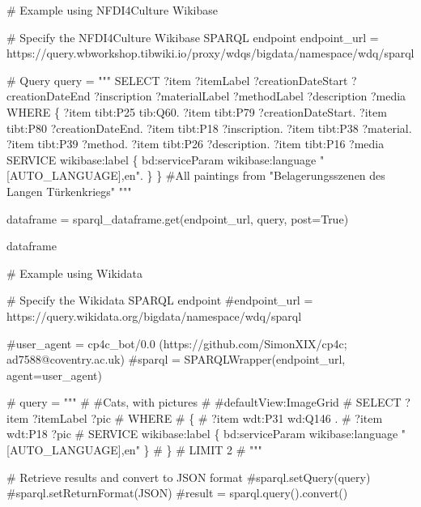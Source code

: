 \documentclass[
  letterpaper,
  DIV=11,
  numbers=noendperiod]{scrreprt}
\newenvironment{Shaded}{\begin{snugshade}}{\end{snugshade}}
\newcommand{\CommentTok}[1]{\textcolor[rgb]{0.37,0.37,0.37}{#1}}
\newcommand{\NormalTok}[1]{\textcolor[rgb]{0.00,0.23,0.31}{#1}}
\newcommand{\OperatorTok}[1]{\textcolor[rgb]{0.37,0.37,0.37}{#1}}
\newcommand{\StringTok}[1]{\textcolor[rgb]{0.13,0.47,0.30}{#1}}
\newcommand{\VariableTok}[1]{\textcolor[rgb]{0.07,0.07,0.07}{#1}}
\begin{document}
\begin{Shaded}
\begin{Highlighting}[]
\CommentTok{\# Example using NFDI4Culture Wikibase}

\CommentTok{\# Specify the NFDI4Culture Wikibase SPARQL endpoint}
\NormalTok{endpoint\_url }\OperatorTok{=} \StringTok{\textquotesingle{}https://query.wbworkshop.tibwiki.io/proxy/wdqs/bigdata/namespace/wdq/sparql\textquotesingle{}}

\CommentTok{\# Query}
\NormalTok{query }\OperatorTok{=} \StringTok{"""}
\StringTok{SELECT ?item ?itemLabel ?creationDateStart ?creationDateEnd ?inscription ?materialLabel ?methodLabel ?description ?media}
\StringTok{WHERE \{ }
\StringTok{    ?item tibt:P25 tib:Q60.}
\StringTok{    ?item tibt:P79 ?creationDateStart.}
\StringTok{    ?item tibt:P80 ?creationDateEnd.}
\StringTok{    ?item tibt:P18 ?inscription.}
\StringTok{    ?item tibt:P38 ?material.}
\StringTok{    ?item tibt:P39 ?method.}
\StringTok{    ?item tibt:P26 ?description.}
\StringTok{    ?item tibt:P16 ?media}
\StringTok{    SERVICE wikibase:label \{ bd:serviceParam wikibase:language "[AUTO\_LANGUAGE],en". \}}
\StringTok{\} }
\StringTok{\#All paintings from "Belagerungsszenen des Langen Türkenkriegs"}
\StringTok{"""}

\NormalTok{dataframe }\OperatorTok{=}\NormalTok{ sparql\_dataframe.get(endpoint\_url, query, post}\OperatorTok{=}\VariableTok{True}\NormalTok{)}

\NormalTok{dataframe}

\CommentTok{\# Example using Wikidata}

\CommentTok{\# Specify the Wikidata SPARQL endpoint}
\CommentTok{\#endpoint\_url = \textquotesingle{}https://query.wikidata.org/bigdata/namespace/wdq/sparql\textquotesingle{}}

\CommentTok{\#user\_agent = \textquotesingle{}cp4c\_bot/0.0 (https://github.com/SimonXIX/cp4c; ad7588@coventry.ac.uk)\textquotesingle{}}
\CommentTok{\#sparql = SPARQLWrapper(endpoint\_url, agent=user\_agent)}

\CommentTok{\# query = """}
\CommentTok{\# \#Cats, with pictures}
\CommentTok{\# \#defaultView:ImageGrid}
\CommentTok{\# SELECT ?item ?itemLabel ?pic}
\CommentTok{\# WHERE}
\CommentTok{\# \{}
\CommentTok{\# ?item wdt:P31 wd:Q146 .}
\CommentTok{\# ?item wdt:P18 ?pic}
\CommentTok{\# SERVICE wikibase:label \{ bd:serviceParam wikibase:language "[AUTO\_LANGUAGE],en" \}}
\CommentTok{\# \}}
\CommentTok{\# LIMIT 2}
\CommentTok{\# """}

\CommentTok{\# Retrieve results and convert to JSON format}
\CommentTok{\#sparql.setQuery(query)}
\CommentTok{\#sparql.setReturnFormat(JSON)}
\CommentTok{\#result = sparql.query().convert()}


\end{Highlighting}
\end{Shaded}
\end{document}
